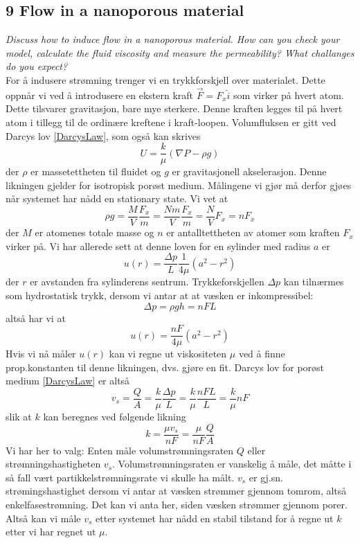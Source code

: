 \documentclass[english, a4paper]{article}
\begin{document}
\subsection{9 Flow in a nanoporous material}
\textit{Discuss how to induce flow in a nanoporous material. How can you check your model,
calculate the fluid viscosity and measure the permeability? What challanges do you expect?} \\

\noindent
For å indusere strømning trenger vi en trykkforskjell over materialet. Dette oppnår vi ved å
introdusere en ekstern kraft $\vec{F} = F_x\hat{i}$ som virker på hvert atom. 
Dette tilsvarer gravitasjon, bare mye sterkere. Denne kraften legges til på hvert atom
i tillegg til de ordinære kreftene i kraft-loopen. Volumfluksen er gitt ved Darcys lov \eqref{DarcysLaw}, 
som også kan skrives
\begin{equation}
 U = \frac{k}{\mu} (\nabla P - \rho g)
\end{equation}
der $\rho$ er massetettheten til fluidet og $g$ er gravitasjonell akselerasjon. 
Denne likningen gjelder for isotropisk porøst medium. Målingene vi gjør må derfor gjøes når systemet
har nådd en stationary state. Vi vet at
\begin{equation}
 \rho g = \frac{M}{V} \frac{F_x}{m} = \frac{Nm}{V}\frac{F_x}{m} = \frac{N}{V}F_x = nF_x
\end{equation}
der $M$ er atomenes totale masse og $n$ er antalltettheten av atomer som kraften $F_x$ virker på. 
Vi har allerede sett at denne loven for en sylinder med radius $a$ er
\begin{equation}
  u(r) = \frac{\Delta p}{L} \frac{1}{4\mu} (a^2 - r^2)
\end{equation}
der $r$ er avstanden fra sylinderens sentrum. Trykkeforskjellen $\Delta p$ kan tilnærmes
som hydrostatisk trykk, dersom vi antar at at væsken er inkompressibel:
\begin{equation}
 \Delta p = \rho gh = nFL
\end{equation}
altså har vi at
\begin{equation}
 u(r) = \frac{nF}{4\mu}(a^2 - r^2)
\end{equation}
Hvis vi nå måler $u(r)$ kan vi regne ut viskositeten $\mu$ ved å finne prop.konstanten til denne likningen, dvs.
gjøre en fit. 
Darcys lov for porøst medium \eqref{DarcysLaw}
er altså
\begin{equation}
 v_s = \frac{Q}{A} = \frac{k}{\mu}\frac{\Delta p}{L} = \frac{k}{\mu}\frac{nFL}{L} = \frac{k}{\mu}nF
\end{equation}
slik at $k$ kan beregnes ved følgende likning
\begin{equation}
 k = \frac{\mu v_s}{nF}  = \frac{\mu}{nF}\frac{Q}{A}
\end{equation}
Vi har her to valg: Enten måle volumstrømningsraten $Q$ eller strømningshastigheten $v_s$. 
Volumstrømningsraten er vanskelig å måle, det måtte i så fall vært partikkelstrømningsrate vi skulle ha målt. 
$v_s$ er gj.sn. strømingshastighet dersom vi antar at væsken strømmer gjennom tomrom, altså enkelfasestrømning. 
Det kan vi anta her, siden væsken strømmer gjennom porer. Altså kan vi måle $v_s$ etter systemet har nådd
en stabil tilstand for å regne ut $k$ etter vi har regnet ut $\mu$. 
\end{document}

